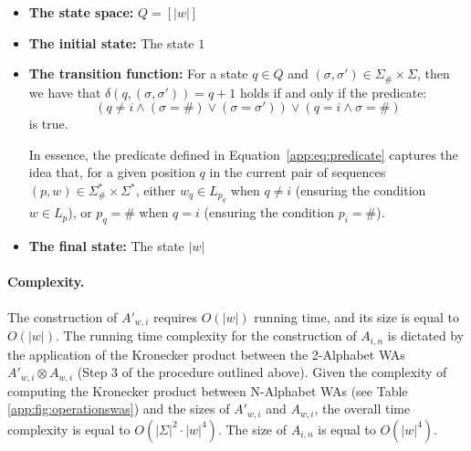 \begin{itemize}
    \item \textbf{The state space:} $Q = [|w|]$
    \item \textbf{The initial state:} The state $1$
    \item \textbf{The transition function:} For a state $q \in Q$ and $(\sigma,\sigma') \in \Sigma_{\#} \times \Sigma$, then we have that $\delta(q, (\sigma, \sigma')) = q+1$ holds if and only if the predicate: 
     \begin{equation} \label{app:eq:predicate}
      \left(q \neq i \land (\sigma = \#) \lor (\sigma = \sigma') \right) \lor (q = i \land \sigma = \# )
     \end{equation}
     is true.


     
In essence, the predicate defined in Equation~\eqref{app:eq:predicate} captures the idea that, for a given position $q$ in the current pair of sequences $(p,w) \in \Sigma_{\#}^{*} \times \Sigma^{*}$, either $w_{q} \in L_{p_{q}}$ when $q \neq i$ (ensuring the condition $w \in L_p$), or $p_q = \#$ when $q = i$ (ensuring the condition $p_i = \#$).
     
    \item \textbf{The final state:} The state $|w|$
\end{itemize}

\paragraph{Complexity.} The construction of $A'_{w,i}$ requires $O(|w|)$ running time, and its size is equal to $O(|w|)$. The running time complexity for the construction of $A_{i,n}$ is dictated by the application of the Kronecker product between the 2-Alphabet WAs $A'_{w,i} \otimes A_{w,i}$ (Step 3 of the procedure outlined above). Given the complexity of computing the Kronecker product between N-Alphabet WAs (see Table \ref{app:fig:operationswas}) and the sizes of $A'_{w,i}$ and $A_{w,i}$, the overall time complexity is equal to $O(|\Sigma|^{2} \cdot |w|^{4})$. The size of $A_{i,n}$ is equal to $O(|w|^{4})$.  

